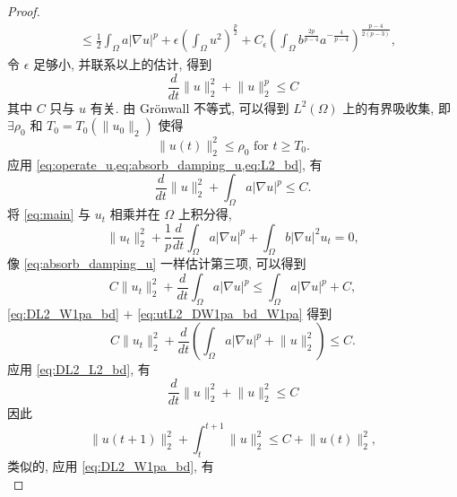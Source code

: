 \documentclass[twoside,longtitle]{LZUthesis}
\theoremstyle{definition}
\numberwithin{equation}{chapter}
\newcommand*\abs[1]{\lvert#1\rvert}
\newcommand*\norm[1]{\lVert#1\rVert}
\begin{document}
\begin{proof}
\begin{equation}
\begin{split}
			&\leq \frac{1}{2}\int_{\Omega}a\abs{\nabla u}^p
			+ \epsilon \left(\int_{\Omega}u^2\right)^{\frac{p}{2}}
			+ C_{\epsilon}\left(\int_{\Omega}b^{\frac{2p}{p-4}}a^{-\frac{4}{p-4}}\right)^{\frac{p-4}{2(p-3)}},
		\end{split}
	\end{equation}
	令 $\epsilon$ 足够小, 并联系以上的估计, 得到
	\begin{equation}\label{eq:DL2_L2_bd}
		\frac{d}{dt}\norm{u}_2^2 + \norm{u}_2^p \leq C
	\end{equation}
	其中 $C$ 只与 $u$ 有关. 由 Gr\"onwall 不等式, 可以得到 $L^2(\Omega)$ 上的有界吸收集,
	即 $\exists \rho_0$ 和
	$T_0 = T_0(\norm{u_0}_2)$ 使得
	\begin{equation}\label{eq:L2_bd}
		\norm{u(t)}_2^2 \leq \rho_0 \text{ for } t \geq T_0.
	\end{equation}
	应用 \cref{eq:operate_u,eq:absorb_damping_u,eq:L2_bd}, 有
	\begin{equation}\label{eq:DL2_W1pa_bd}
		\frac{d}{dt}\norm{u}_2^2 + \int_{\Omega}a \abs{\nabla u}^p \leq C.
	\end{equation}
	将 \cref{eq:main} 与 $u_{t}$ 相乘并在 $\Omega$ 上积分得,
	\begin{equation}\label{eq:operate_ut}
		\norm{u_t}_2^2
		+ \frac{1}{p}\frac{d}{dt}\int_{\Omega}a \abs{\nabla u}^p
		+ \int_{\Omega}b \abs{\nabla u}^2 u_t
		= 0,
	\end{equation}
	像 \cref{eq:absorb_damping_u} 一样估计第三项, 可以得到
	\begin{equation}\label{eq:utL2_DW1pa_bd_W1pa}
		C\norm{u_t}_2^2
		+ \frac{d}{dt}\int_{\Omega}a \abs{\nabla u}^p
		\leq \int_{\Omega}a \abs{\nabla u}^p
		+ C,
	\end{equation}
	\cref{eq:DL2_W1pa_bd} $+$ \cref{eq:utL2_DW1pa_bd_W1pa} 得到
	\begin{equation}\label{eq:utL2_DW1pa_DL2}
		C\norm{u_t}_2^2
		+ \frac{d}{dt}\left(\int_{\Omega}a \abs{\nabla u}^p
		+ \norm{u}_2^2\right)
		\leq C.
	\end{equation}
	应用 \cref{eq:DL2_L2_bd}, 有
	\begin{equation}
		\frac{d}{dt}\norm{u}_2^2 + \norm{u}_2^2 \leq C
	\end{equation}
	因此
	\begin{equation}\label{eq:int_DL2_L2_bd}
		\norm{u(t+1)}_2^2
		+ \int_t^{t+1}\norm{u}_2^2
		\leq C + \norm{u(t)}_2^2,
	\end{equation}
	类似的, 应用 \cref{eq:DL2_W1pa_bd}, 有
	\begin{equation}\label{eq:int_DL2_W1pa_bd}

\end{equation}
\end{proof}
\end{document}
